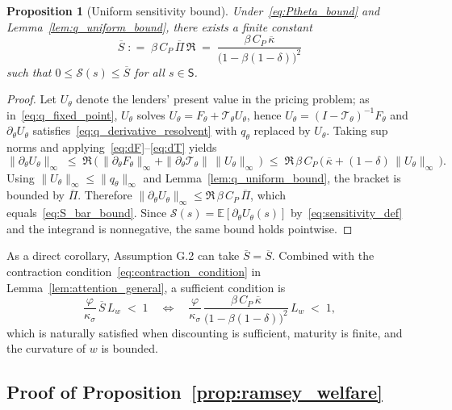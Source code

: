 \documentclass[12pt]{article}
\providecommand{\coloneqq}{\mathrel{\mathop:}=}
\theoremstyle{plain}
\newtheorem{proposition}{Proposition}
\newcommand{\E}{\mathbb{E}}
\begin{document}
\begin{proposition}[Uniform sensitivity bound]\label{prop:S_uniform_bound}
	Under~\eqref{eq:Ptheta_bound} and Lemma~\ref{lem:q_uniform_bound}, there exists a finite constant
	\begin{equation}\label{eq:S_bar_bound}
		\overline S\;\coloneqq\;\beta\,C_P\,\overline\Pi\,\mathfrak R\;=\;\frac{\beta\,C_P\,\overline\kappa}{\big(1-\beta(1-\delta)\big)^2}
	\end{equation}
	such that $0\le \mathcal S(s)\le \overline S$ for all $s\in\mathsf S$.
\end{proposition}

\begin{proof}
	Let $U_\theta$ denote the lenders’ present value in the pricing problem; as in~\eqref{eq:q_fixed_point}, $U_\theta$ solves $U_\theta=F_\theta+\mathcal T_\theta U_\theta$, hence $U_\theta=(I-\mathcal T_\theta)^{-1}F_\theta$ and $\partial_\theta U_\theta$ satisfies~\eqref{eq:q_derivative_resolvent} with $q_\theta$ replaced by $U_\theta$. Taking sup norms and applying~\eqref{eq:dF}–\eqref{eq:dT} yields
	\[ \big\|\partial_\theta U_\theta\big\|_\infty \;\le\; \mathfrak R\,\Big(\,\|\partial_\theta F_\theta\|_\infty + \|\partial_\theta \mathcal T_\theta\|\,\|U_\theta\|_\infty\,\Big) \;\le\; \mathfrak R\,\beta\,C_P\,\Big(\,\overline\kappa + (1-\delta)\,\|U_\theta\|_\infty\,\Big). \]
	Using $\|U_\theta\|_\infty\le \|q_\theta\|_\infty$ and
	Lemma~\ref{lem:q_uniform_bound}, the bracket is bounded by $\overline\Pi$.
	Therefore $\|\partial_\theta U_\theta\|_\infty \le \mathfrak
		R\,\beta\,C_P\,\overline\Pi$, which equals~\eqref{eq:S_bar_bound}. Since
	$\mathcal S(s)=\E[\partial_\theta U_\theta(s)]$ by~\eqref{eq:sensitivity_def}
	and the integrand is nonnegative, the same bound holds pointwise.
\end{proof}

As a direct corollary, Assumption G.2 can take $\bar S=\overline S$. Combined
with the contraction condition~\eqref{eq:contraction_condition} in
Lemma~\ref{lem:attention_general}, a sufficient condition is
\[ \frac{\varphi}{\kappa_\sigma}\,\overline S\,L_w\;<\;1\quad\Longleftrightarrow\quad \frac{\varphi}{\kappa_\sigma}\,\frac{\beta\,C_P\,\overline\kappa}{\big(1-\beta(1-\delta)\big)^2}\,L_w\;<\;1, \]
which is naturally satisfied when discounting is sufficient, maturity is
finite, and the curvature of $w$ is bounded.

\subsection{Proof of Proposition~\ref{prop:ramsey_welfare}}\label{app:proof_ramsey}
\end{document}
